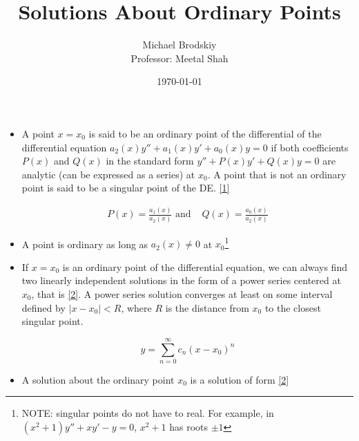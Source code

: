 \documentclass[12pt]{article}
\title{Solutions About Ordinary Points}
\date{\today}
\author{Michael Brodskiy\\ \small Professor: Meetal Shah}
\begin{document}
\maketitle

\begin{itemize}

  \item A point $x=x_0$ is said to be an ordinary point of the differential of the differential equation $a_2(x)y''+a_1(x)y'+a_0(x)y=0$ if both coefficients $P(x)$ and $Q(x)$ in the standard form $y''+P(x)y'+Q(x)y=0$ are analytic (can be expressed as a series) at $x_0$. A point that is not an ordinary point is said to be a singular point of the DE. \eqref{1}

    \begin{equation}
      \begin{split}
        P(x)=\frac{a_1(x)}{a_2(x)} \text{ and }& Q(x)=\frac{a_0(x)}{a_2(x)}
      \end{split}
      \label{1}
    \end{equation}

  \item A point is ordinary as long as $a_2(x)\neq0$ at $x_0$\footnote{NOTE: singular points do not have to real. For example, in $(x^2+1)y''+xy'-y=0$, $x^2+1$ has roots $\pm1$}

  \item If $x=x_0$ is an ordinary point of the differential equation, we can always find two linearly independent solutions in the form of a power series centered at $x_0$, that is \eqref{2}. A power series solution converges at least on some interval defined by $|x-x_0|<R$, where $R$ is the distance from $x_0$ to the closest singular point.

    \begin{equation}
      y=\sum_{n=0}^{\infty} c_n(x-x_0)^n
      \label{2}
    \end{equation}

  \item A solution about the ordinary point $x_0$ is a solution of form \eqref{2}

\end{itemize}
\end{document}
